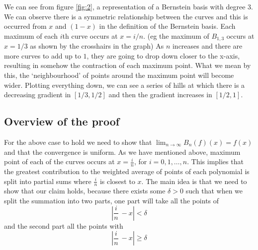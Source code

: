 \documentclass{article}
\begin{document}
\newpage
We can see from figure \ref{fig:2}, a representation of a Bernstein basis with degree $3$. We can observe there is a symmetric relationship between the curves and this is occurred from $x$ and $(1-x)$ in the definition of the Bernstein basis. Each maximum of each $i$th curve occurs at $x=i/n$. (eg the maximum of $B_{1,3}$ occurs at $x=1/3$ as shown by the crosshairs in the graph) As $n$ increases and there are more curves to add up to $1$, they are going to drop down closer to the x-axis, resulting in somehow the contraction of each maximum point. What we mean by this, the `neighbourhood' of points around the maximum point will become wider. Plotting everything down, we can see a series of hills at which there is a decreasing gradient in $[1/3, 1/2]$ and then the gradient increases in $[1/2, 1]$.
\subsection{Overview of the proof}
For the above case to hold we need to show that $\lim_{n \rightarrow{\infty} }B_n(f)(x)=f(x)$ and that the convergence is uniform.
As we have mentioned above, maximum point of each of the curves occurs at $x=\frac{i}{n}$, for $i=0,1, \dots ,n$.
This implies that the greatest contribution to the weighted average of points of each polynomial is split into partial sums where $\frac{i}{n}$ is closest to $x$.
The main idea is that we need to show that our claim holds, because there exists some $\delta>0$ such that when we split the summation into two parts, one part will take all the points of
\begin{equation}
\left|\frac{i}{n}\ - x\right|< \delta    
\end{equation}
 and the second part all the points with 
 \begin{equation}
  \left|\frac{i}{n}\ - x\right|\geq \delta   
 \end{equation}
\end{document}
